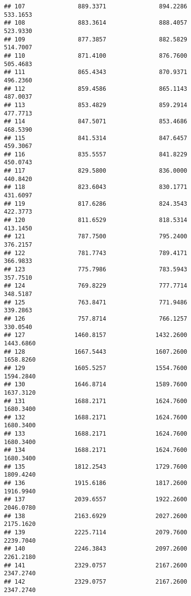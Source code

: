 \documentclass[]{article}
\begin{document}
\begin{verbatim}
## 107               889.3371               894.2286            533.1653
## 108               883.3614               888.4057            523.9330
## 109               877.3857               882.5829            514.7007
## 110               871.4100               876.7600            505.4683
## 111               865.4343               870.9371            496.2360
## 112               859.4586               865.1143            487.0037
## 113               853.4829               859.2914            477.7713
## 114               847.5071               853.4686            468.5390
## 115               841.5314               847.6457            459.3067
## 116               835.5557               841.8229            450.0743
## 117               829.5800               836.0000            440.8420
## 118               823.6043               830.1771            431.6097
## 119               817.6286               824.3543            422.3773
## 120               811.6529               818.5314            413.1450
## 121               787.7500               795.2400            376.2157
## 122               781.7743               789.4171            366.9833
## 123               775.7986               783.5943            357.7510
## 124               769.8229               777.7714            348.5187
## 125               763.8471               771.9486            339.2863
## 126               757.8714               766.1257            330.0540
## 127              1460.8157              1432.2600           1443.6860
## 128              1667.5443              1607.2600           1658.8260
## 129              1605.5257              1554.7600           1594.2840
## 130              1646.8714              1589.7600           1637.3120
## 131              1688.2171              1624.7600           1680.3400
## 132              1688.2171              1624.7600           1680.3400
## 133              1688.2171              1624.7600           1680.3400
## 134              1688.2171              1624.7600           1680.3400
## 135              1812.2543              1729.7600           1809.4240
## 136              1915.6186              1817.2600           1916.9940
## 137              2039.6557              1922.2600           2046.0780
## 138              2163.6929              2027.2600           2175.1620
## 139              2225.7114              2079.7600           2239.7040
## 140              2246.3843              2097.2600           2261.2180
## 141              2329.0757              2167.2600           2347.2740
## 142              2329.0757              2167.2600           2347.2740

\end{verbatim}
\end{document}
